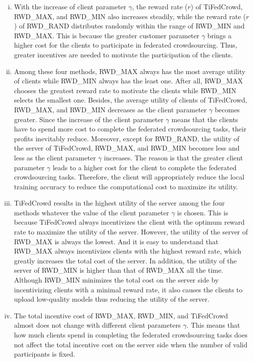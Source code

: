 \documentclass[final,1p,times]{elsarticle}
\begin{document}
\begin{enumerate}[(i)]
	\item With the increase of client parameter $\gamma$, the reward rate ($r$) of TiFedCrowd, RWD\_MAX, and RWD\_MIN also increases steadily, while the reward rate ($r$) of RWD\_RAND distributes randomly within the range of RWD\_MIN and RWD\_MAX. This is because the greater customer parameter $\gamma$ brings a higher cost for the clients to participate in federated crowdsourcing. Thus, greater incentives are needed to motivate the participation of the clients.
	\item Among these four methods, RWD\_MAX always has the most average utility of clients while RWD\_MIN always has the least one. After all, RWD\_MAX chooses the greatest reward rate to motivate the clients while RWD\_MIN selects the smallest one. Besides, the average utility of clients of TiFedCrowd, RWD\_MAX, and RWD\_MIN decreases as the client parameter $\gamma$ becomes greater. Since the increase of the client parameter $\gamma$ means that the clients have to spend more cost to complete the federated crowdsourcing tasks, their profits inevitably reduce. Moreover, except for RWD\_RAND, the utility of the server of TiFedCrowd, RWD\_MAX, and RWD\_MIN becomes less and less as the client parameter $\gamma$ increases. The reason is that the greater client parameter $\gamma$ leads to a higher cost for the client to complete the federated crowdsourcing tasks. Therefore, the client will appropriately reduce the local training accuracy to reduce the computational cost to maximize its utility.
	\item TiFedCrowd results in the highest utility of the server among the four methods whatever the value of the client parameter $\gamma$ is chosen. This is because TiFedCrowd always incentivizes the client with the optimum reward rate to maximize the utility of the server. However, the utility of the server of RWD\_MAX is always the lowest. And it is easy to understand that RWD\_MAX always incentivizes clients with the highest reward rate, which greatly increases the total cost of the server. In addition, the utility of the server of RWD\_MIN is higher than that of RWD\_MAX all the time. Although RWD\_MIN minimizes the total cost on the server side by incentivizing clients with a minimal reward rate, it also causes the clients to upload low-quality models thus reducing the utility of the server.
	\item The total incentive cost of RWD\_MAX, RWD\_MIN, and TiFedCrowd almost does not change with different client parameters $\gamma$. This means that how much clients spend in completing the federated crowdsourcing tasks does not affect the total incentive cost on the server side when the number of valid participants is fixed.

\end{enumerate}
\end{document}
